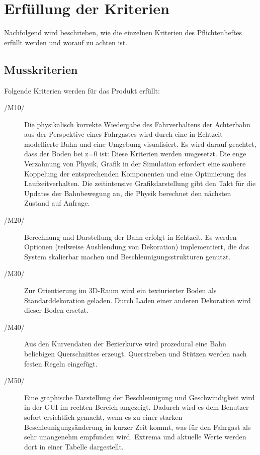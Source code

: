 \chapter{Erfüllung der Kriterien}

Nachfolgend wird beschrieben, wie die einzelnen Kriterien des Pflichtenheftes
erfüllt werden und worauf zu achten ist.
\section{Musskriterien}

Folgende Kriterien werden für das Produkt erfüllt:
\begin{description}
	\item[/M10/] Die physikalisch korrekte Wiedergabe des Fahrverhaltens der Achterbahn aus der Perspektive eines Fahrgastes wird durch eine in Echtzeit modellierte Bahn und eine Umgebung visualisiert. Es wird darauf geachtet, dass der Boden bei z=0 ist: Diese Kriterien werden umgesetzt. Die enge Verzahnung von Physik, Grafik in der Simulation erfordert eine saubere Koppelung der entsprechenden Komponenten und
eine Optimierung des Laufzeitverhalten. Die zeitintensive Grafikdarstellung gibt den Takt für die Updates der Bahnbewegung an, die Physik berechnet den nächsten Zustand auf Anfrage.
	\item[/M20/] Berechnung und Darstellung der Bahn erfolgt in Echtzeit. Es werden Optionen (teilweise Ausblendung von Dekoration) implementiert, die das System skalierbar machen und Beschleunigungsstrukturen genutzt.
	\item[/M30/] Zur Orientierung im 3D-Raum wird ein texturierter Boden als Standarddekoration geladen. Durch Laden einer anderen Dekoration wird dieser Boden ersetzt.
	\item[/M40/] Aus den Kurvendaten der Bezierkurve wird prozedural eine Bahn beliebigen Querschnittes erzeugt. Querstreben und Stützen werden nach festen Regeln eingefügt.
	\item[/M50/] Eine graphische Darstellung der Beschleunigung und Geschwindigkeit wird in der GUI im rechten Bereich angezeigt. Dadurch wird es dem Benutzer sofort ersichtlich gemacht, wenn es zu einer starken Beschleunigungsänderung in kurzer Zeit kommt, was für den Fahrgast als sehr unangenehm empfunden wird. Extrema und aktuelle Werte werden dort in einer Tabelle dargestellt.
\end{description}

